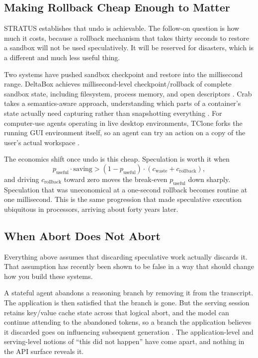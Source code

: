 \subsection{Making Rollback Cheap Enough to Matter}

STRATUS establishes that undo is achievable. The follow-on question is how much it
costs, because a rollback mechanism that takes thirty seconds to restore a sandbox
will not be used speculatively. It will be reserved for disasters, which is a
different and much less useful thing.

Two systems have pushed sandbox checkpoint and restore into the millisecond range.
DeltaBox achieves millisecond-level checkpoint/rollback of complete sandbox state,
including filesystem, process memory, and open descriptors \cite{deltabox2026}.
Crab takes a semantics-aware approach, understanding which parts of a container's
state actually need capturing rather than snapshotting everything
\cite{crab2026}. For computer-use agents operating in live desktop environments,
TClone forks the running GUI environment itself, so an agent can try an action on
a copy of the user's actual workspace \cite{tclone2026}.

The economics shift once undo is this cheap. Speculation is worth it when
\[
p_{\text{useful}} \cdot \text{saving} > (1 - p_{\text{useful}}) \cdot (c_{\text{waste}} + c_{\text{rollback}}),
\]
and driving $c_{\text{rollback}}$ toward zero moves the break-even $p_{\text{useful}}$
down sharply. Speculation that was uneconomical at a one-second rollback becomes
routine at one millisecond. This is the same progression that made speculative
execution ubiquitous in processors, arriving about forty years later.

\subsection{When Abort Does Not Abort}

Everything above assumes that discarding speculative work actually discards it.
That assumption has recently been shown to be false in a way that should change
how you build these systems.

A stateful agent abandons a reasoning branch by removing it from the transcript.
The application is then satisfied that the branch is gone. But the serving session
retains key/value cache state across that logical abort, and the model can
continue attending to the abandoned tokens, so a branch the application
believes it discarded goes on influencing subsequent generation
\cite{abortedkv2026}. The application-level and serving-level notions of ``this
did not happen'' have come apart, and nothing in the API surface reveals it.

